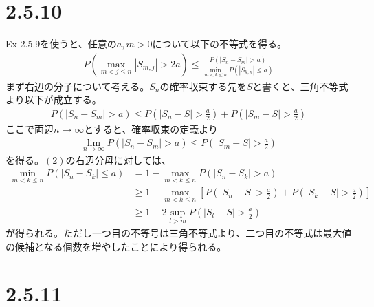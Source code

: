\documentclass{article}
\begin{document}
\section{2.5.10}
Ex 2.5.9を使うと、任意の$a,m > 0$について以下の不等式を得る。
\begin{align}
	P\left( \max_{m<j\leq n} \left|S_{m,j}\right| > 2a \right) \leq\frac{P\left( \left| S_n -S_m \right| > a \right)}{\min_{m<k \leq n}P\left( \left| S_{k, n} \right| \leq a \right)}
\end{align}
まず右辺の分子について考える。$S_n$の確率収束する先を$S$と書くと、三角不等式より以下が成立する。
\begin{align*}
	P\left( \left| S_n - S_m \right| > a \right) \leq P\left( \left| S_n - S \right| > \frac{a}{2} \right) + P\left( \left| S_m - S \right| > \frac{a}{2} \right)
\end{align*}
ここで両辺$n\to \infty$とすると、確率収束の定義より
\begin{align*}
	\lim_{n\to \infty} P\left( \left| S_n - S_m \right| > a \right) \leq P\left( \left| S_m - S \right| > \frac{a}{2} \right)
\end{align*}
を得る。$(2)$の右辺分母に対しては、
\begin{align*}
	\min_{m<k \leq n}P\left( \left| S_n - S_k \right| \leq a \right) &= 1 - \max_{m<k\leq n} P\left( \left| S_n - S_k \right| > a \right)\\[8pt]
	&\geq 1 - \max_{m<k\leq n} \left[ P\left( \left| S_n - S \right| > \frac{a}{2} \right) + P\left( \left| S_k - S \right| > \frac{a}{2} \right) \right]\\[8pt]
	&\geq 1 - 2 \sup_{l > m} P\left( \left| S_l - S \right| > \frac{a}{2} \right)
\end{align*}
が得られる。ただし一つ目の不等号は三角不等式より、二つ目の不等式は最大値の候補となる個数を増やしたことにより得られる。

\section{2.5.11}
\end{document}
